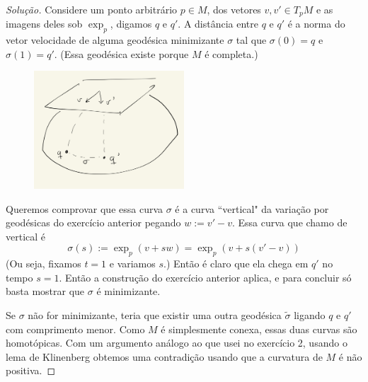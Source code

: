 \begin{proof}[Solução]\leavevmode
	Considere um ponto arbitrário \(p \in M\), dos vetores \(v,v' \in T_pM\) e as imagens deles sob \(\operatorname{exp}_p\), digamos \(q\) e \(q'\). A distância entre \(q\) e \(q'\) é a norma do vetor velocidade de alguma geodésica minimizante \(\sigma\) tal que \(\sigma(0)=q\) e \(\sigma(1)=q'\). (Essa geodésica existe porque \(M\) é completa.)
\begin{figure}[H]
	\centering
	\includegraphics[width=0.5\textwidth]{fig11}
\end{figure}
Queremos comprovar que essa curva \(\sigma\) é a curva ``vertical" da variação por geodésicas do exercício anterior pegando \(w:=v'-v\). Essa curva que chamo de vertical é
\[\sigma(s):=\operatorname{exp}_p(v+sw)=\operatorname{exp}_p(v+s(v'-v))\]
(Ou seja, fixamos \(t=1\) e variamos \(s\).) Então é claro que ela chega em \(q'\) no tempo \(s=1\). Então a construção do exercício anterior aplica, e para concluir só basta mostrar que \(\sigma\) é minimizante.

Se \(\sigma\) não for minimizante, teria que existir uma outra geodésica \(\tilde{\sigma}\) ligando \(q\) e \(q'\) com comprimento menor. Como \(M\) é simplesmente conexa, essas duas curvas são homotópicas. Com um argumento análogo ao que usei no exercício 2, usando o lema de Klinenberg obtemos uma contradição usando que a curvatura de \(M\) é não positiva.



\end{proof}
